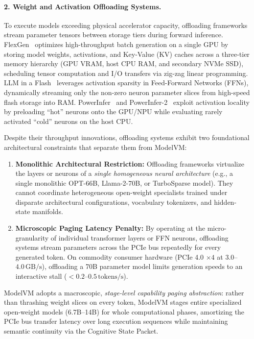 \paragraph{2. Weight and Activation Offloading Systems.}
To execute models exceeding physical accelerator capacity, offloading frameworks stream parameter tensors between storage tiers during forward inference. FlexGen~\cite{sheng2023flexgen} optimizes high-throughput batch generation on a single GPU by storing model weights, activations, and Key-Value (KV) caches across a three-tier memory hierarchy (GPU VRAM, host CPU RAM, and secondary NVMe SSD), scheduling tensor computation and I/O transfers via zig-zag linear programming. LLM in a Flash~\cite{alwani2023llmflash} leverages activation sparsity in Feed-Forward Networks (FFNs), dynamically streaming only the non-zero neuron parameter slices from high-speed flash storage into RAM. PowerInfer~\cite{song2024powerinfer} and PowerInfer-2~\cite{song2024powerinfer2} exploit activation locality by preloading ``hot'' neurons onto the GPU/NPU while evaluating rarely activated ``cold'' neurons on the host CPU.

Despite their throughput innovations, offloading systems exhibit two foundational architectural constraints that separate them from ModelVM:
\begin{enumerate}
    \item \textbf{Monolithic Architectural Restriction:} Offloading frameworks virtualize the layers or neurons of a \textit{single homogeneous neural architecture} (e.g., a single monolithic OPT-66B, Llama-2-70B, or TurboSparse model). They cannot coordinate heterogeneous open-weight specialists trained under disparate architectural configurations, vocabulary tokenizers, and hidden-state manifolds.
    \item \textbf{Microscopic Paging Latency Penalty:} By operating at the micro-granularity of individual transformer layers or FFN neurons, offloading systems stream parameters across the PCIe bus repeatedly for every generated token. On commodity consumer hardware (PCIe 4.0 $\times 4$ at $3.0$--$4.0\,\text{GB/s}$), offloading a 70B parameter model limits generation speeds to an interactive stall ($< 0.2$--$0.5\,\text{tokens/s}$).
\end{enumerate}
ModelVM adopts a macroscopic, \textit{stage-level capability paging abstraction}: rather than thrashing weight slices on every token, ModelVM stages entire specialized open-weight models (6.7B--14B) for whole computational phases, amortizing the PCIe bus transfer latency over long execution sequences while maintaining semantic continuity via the Cognitive State Packet.

